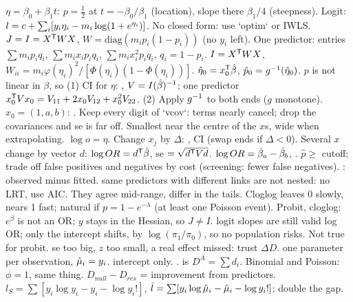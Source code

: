 \sk{} $\eta=\beta_0+\beta_1t$: $p=\frac12$ at $t=-\beta_0/\beta_1$ (location), slope there $\beta_1/4$ (steepness).
Logit: $l=c+\sum_{i}[y_i\eta_i-m_i\log(1+e^{\eta_i})]$. No closed form: use `optim` or IWLS.
\sk{} $J=I=X^{\mathsf T} WX$, $W=\mathrm{diag}(m_ip_i(1-p_i))$ (no $y_i$ left). One predictor: entries $\sum m_ip_iq_i$, $\sum m_ix_ip_iq_i$, $\sum m_ix_i^2p_iq_i$, $q_i=1-p_i$.
\sk{} $I=X^{\mathsf T} WX$, $W_{ii}=m_i\varphi(\eta_i)^2/[\Phi(\eta_i)(1-\Phi(\eta_i))]$.
\sk{} $\hat{\eta}_0=x_0^{\mathsf T}\hat{\beta}$, $\hat p_0=g^{-1}(\hat{\eta}_0)$.
\sk{} $p$ is not linear in $\beta$, so (1) CI for $\eta$: , $V=I(\hat{\beta})^{-1}$; one predictor $x_0^{\mathsf T} Vx_0=V_{11}+2x_0V_{12}+x_0^2V_{22}$. (2) Apply $g^{-1}$ to both ends ($g$ monotone).
\sk{} $x_0=(1,a,b)$: . Keep every digit of `vcov`: terms nearly cancel; drop the covariances and se is far off. Smallest near the centre of the $x$s, wide when extrapolating.
\sk{} $\log o=\eta$. Change $x_j$ by $\Delta$: , CI  (swap ends if $\Delta<0$). Several $x$ change by vector $d$: $\log OR=d^{\mathsf T}\hat{\beta}$, se $=\sqrt{d^{\mathsf T} Vd}$.
\sk{} $\log OR=\hat{\beta}_a-\hat{\beta}_b$, .
\sk{} $\hat p\ge$ cutoff; trade off false positives and negatives by cost (screening: fewer false negatives).
\sk{} : observed minus fitted.
\sk{} same predictors with different links are not nested: no LRT, use AIC. They agree mid-range, differ in the tails. Cloglog leaves 0 slowly, nears 1 fast; natural if $p=1-e^{-\lambda}$ (at least one Poisson event). Probit, cloglog: $e^\beta$ is not an OR; $y$ stays in the Hessian, so $J\ne I$.
\sk{} logit slopes are still valid log OR; only the intercept shifts, by $\log(\pi_1/\pi_0)$, so no population risks. Not true for probit.
\sk{} se too big, $z$ too small, a real effect missed: trust $\Delta D$.
  one parameter per observation, $\hat{\mu}_i=y_i$.  intercept only.  .  is $D^A=\sum d_i$. Binomial and Poisson: $\phi=1$, same thing. $D_{null}-D_{res}$ = improvement from predictors.  $l_S=\sum[y_i\log y_i-y_i-\log y_i!]$, $\hat l=\sum[y_i\log\hat{\mu}_i-\hat{\mu}_i-\log y_i!]$; double the gap.
